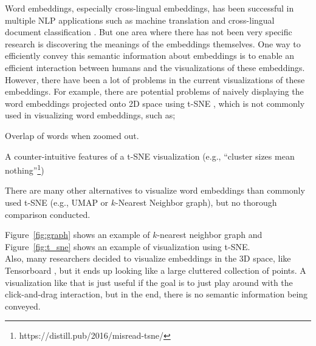 Word embeddings, especially cross-lingual embeddings, has been successful in multiple NLP applications such as machine translation \cite{lample2018unsupervised, artetxe2018unsupervised} and cross-lingual document classification \cite{klementiev-titov-bhattarai:2012:PAPERS}. 
But one area where there has not been very specific research is discovering the meanings of the embeddings themselves. One way to efficiently convey this semantic information about embeddings is to enable an efficient interaction between humans and the visualizations of these embeddings. However, there have been a lot of problems in the current visualizations of these embeddings.
For example, there are potential problems of naively displaying the word embeddings projected onto 2D space using t-SNE \cite{t-sne}, which is not commonly used in visualizing word embeddings, such as;
\begin{itemize*}
  \item Overlap of words when zoomed out. 
  \item A counter-intuitive features of a t-SNE visualization (e.g., ``cluster sizes mean nothing''\footnote{https://distill.pub/2016/misread-tsne/}) 
  \item There are many other alternatives to visualize word embeddings than commonly used t-SNE (e.g., UMAP \cite{umap} or $k$-Nearest Neighbor graph), but no thorough comparison conducted. 
\end{itemize*}
Figure~\ref{fig:graph} shows an example of $k$-nearest neighbor graph and Figure~\ref{fig:t_sne} shows an example of visualization using t-SNE. \\
Also, many researchers decided to visualize embeddings in the 3D space, like Tensorboard \cite{tensorbaord_viz}, but it ends up looking like a large cluttered collection of points. A visualization like that is just useful if the goal is to just play around with the click-and-drag interaction, but in the end, there is no semantic information being conveyed. \\
